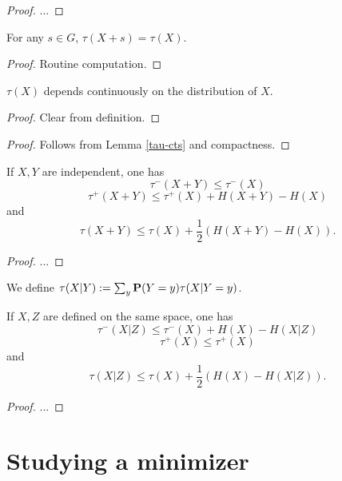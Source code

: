 \begin{proof} ...
\end{proof}

\begin{lemma}\label{tau-invariant}  For any $s \in G$, $\tau(X+s) = \tau(X)$.
\end{lemma}

\begin{proof} Routine computation.
\end{proof}

\begin{lemma}\label{tau-cts} $\tau(X)$ depends continuously on the distribution of $X$.
\end{lemma}

\begin{proof}  Clear from definition.
\end{proof}

\begin{proof} Follows from Lemma \ref{tau-cts} and compactness.
\end{proof}

\begin{lemma}\label{tau-sums}  If $X,Y$ are independent, one has
  $$ \tau^-(X+Y) \leq \tau^-(X)$$
  $$ \tau^+(X+Y) \leq \tau^+(X) + H(X+Y) - H(X)$$
and
  $$ \tau(X+Y) \leq \tau(X) + \frac{1}{2}( H(X+Y) - H(X) ).$$
\end{lemma}

\begin{proof}
  ...
\end{proof}


\begin{definition}  We define $\tau(X|Y) := \sum_y {\bf P}(Y=y) \tau(X|Y=y)$.
\end{definition}

\begin{lemma}  If $X,Z$ are defined on the same space, one has
  $$ \tau^-(X|Z) \leq \tau^-(X) + H(X) - H(X|Z)$$
  $$ \tau^+(X) \leq \tau^+(X)$$
and
  $$ \tau(X|Z) \leq \tau(X) + \frac{1}{2}( H(X) - H(X|Z) ).$$
\end{lemma}

\begin{proof}
  ...
\end{proof}


\section{Studying a minimizer}


